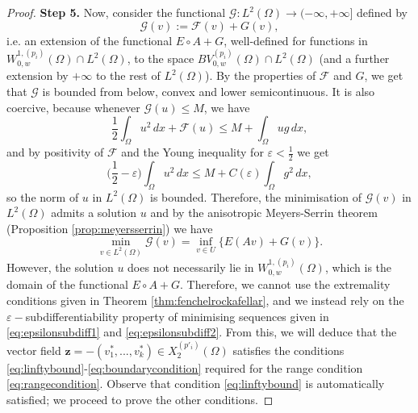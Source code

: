 \documentclass[reqno,12pt]{amsart}
\numberwithin{equation}{section}
\begin{document}
\begin{proof}

{\flushleft \bf Step 5.} Now, consider the functional $\mathcal{G} : L^2(\Omega) \rightarrow (-\infty, + \infty]$ defined by
\begin{equation}
\mathcal{G} (v) := \mathcal{F}(v) + G(v),
\end{equation}
i.e. an extension of the functional $E \circ A + G$, well-defined for functions in $W_{0,w}^{1,(p_i)}(\Omega) \cap L^2(\Omega)$, to the space $BV_{0,w}^{(p_i)}(\Omega) \cap L^2(\Omega)$ (and a further extension by $+\infty$ to the rest of $L^2(\Omega)$). By the properties of $\mathcal{F}$ and $G$, we get that $\mathcal{G}$ is bounded from below, convex and lower semicontinuous. It is also coercive, because whenever $\mathcal{G}(u) \leq M$, we have
\begin{equation}
\frac12 \int_\Omega u^2 \, dx + \mathcal{F}(u) \leq M + \int_\Omega u g \, dx,
\end{equation}
and by positivity of $\mathcal{F}$ and the Young inequality for $\varepsilon < \frac12$ we get
\begin{equation}
\bigg(\frac12 - \varepsilon \bigg) \int_\Omega u^2 \, dx \leq M + C(\varepsilon) \int_\Omega g^2 \, dx,
\end{equation}
so the norm of $u$ in $L^2(\Omega)$ is bounded. Therefore, the minimisation of $\mathcal{G}(v)$ in $L^2(\Omega)$ admits a solution $u$ and by the anisotropic Meyers-Serrin theorem (Proposition \ref{prop:meyersserrin}) we have
\begin{equation}
\min_{v \in L^2(\Omega)} \mathcal{G}(v) = \inf_{v \in U} \bigg\{ E(Av) + G(v) \bigg\}.
\end{equation}
However, the solution $u$ does not necessarily lie in $W_{0,w}^{1,(p_i)}(\Omega)$, which is the domain of the functional $E \circ A + G$. Therefore, we cannot use the extremality conditions given in Theorem \ref{thm:fenchelrockafellar}, and we instead rely on the $\varepsilon-$subdifferentiability property of minimising sequences given in \eqref{eq:epsilonsubdiff1} and \eqref{eq:epsilonsubdiff2}. From this, we will deduce that the vector field $\mathbf{z} = -(v_1^*,...,v_k^*) \in X_2^{(p'_i)}(\Omega)$ satisfies the conditions \eqref{eq:linftybound}-\eqref{eq:boundarycondition} required for the range condition \eqref{eq:rangecondition}. Observe that condition \eqref{eq:linftybound} is automatically satisfied; we proceed to prove the other conditions.


\end{proof}
\end{document}
